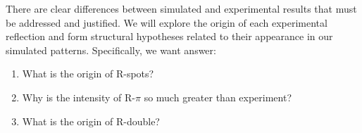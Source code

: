\documentclass[journal=jpcbfk,manusciprt=article]{achemso}
\begin{document}
  There are clear differences between simulated and experimental results that must be addressed
  and justified. We will explore the origin of each experimental reflection and form structural
  hypotheses related to their appearance in our simulated patterns. Specifically, we want answer:  
  \begin{enumerate}
	\item What is the origin of R-spots?
  	\item Why is the intensity of R-$\pi$ so much greater than experiment?
  	\item What is the origin of R-double?
  \end{enumerate}
  
%
%
\end{document}
